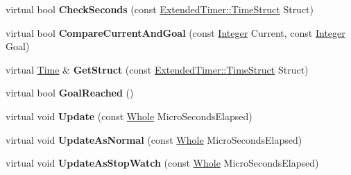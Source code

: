\begin{DoxyCompactItemize}
\item 
\hypertarget{classMezzanine_1_1ExtendedTimer_a14b36dde56ab4f89e9d98b8ba8302495}{
virtual bool {\bfseries CheckSeconds} (const \hyperlink{classMezzanine_1_1ExtendedTimer_a52119e2da54ea7ae5da0dc1f921a3b61}{ExtendedTimer::TimeStruct} Struct)}
\label{classMezzanine_1_1ExtendedTimer_a14b36dde56ab4f89e9d98b8ba8302495}

\item 
\hypertarget{classMezzanine_1_1ExtendedTimer_a0ec0f675c3bf946a2d732cd2916d8c4a}{
virtual bool {\bfseries CompareCurrentAndGoal} (const \hyperlink{namespaceMezzanine_ac3576e52af3c62d13dde94829e0c5465}{Integer} Current, const \hyperlink{namespaceMezzanine_ac3576e52af3c62d13dde94829e0c5465}{Integer} Goal)}
\label{classMezzanine_1_1ExtendedTimer_a0ec0f675c3bf946a2d732cd2916d8c4a}

\item 
\hypertarget{classMezzanine_1_1ExtendedTimer_ae9ff83ca2cb8082578c548edb6a6f3bf}{
virtual \hyperlink{structMezzanine_1_1Time}{Time} \& {\bfseries GetStruct} (const \hyperlink{classMezzanine_1_1ExtendedTimer_a52119e2da54ea7ae5da0dc1f921a3b61}{ExtendedTimer::TimeStruct} Struct)}
\label{classMezzanine_1_1ExtendedTimer_ae9ff83ca2cb8082578c548edb6a6f3bf}

\item 
\hypertarget{classMezzanine_1_1ExtendedTimer_a99040c65bdb611e5b58fe185f3715083}{
virtual bool {\bfseries GoalReached} ()}
\label{classMezzanine_1_1ExtendedTimer_a99040c65bdb611e5b58fe185f3715083}

\item 
\hypertarget{classMezzanine_1_1ExtendedTimer_a5d09b15c9c98e55023b58a71044a8831}{
virtual void {\bfseries Update} (const \hyperlink{namespaceMezzanine_adcbb6ce6d1eb4379d109e51171e2e493}{Whole} MicroSecondsElapsed)}
\label{classMezzanine_1_1ExtendedTimer_a5d09b15c9c98e55023b58a71044a8831}

\item 
\hypertarget{classMezzanine_1_1ExtendedTimer_aa8c5facae695e3c413d614fc7fe2b54e}{
virtual void {\bfseries UpdateAsNormal} (const \hyperlink{namespaceMezzanine_adcbb6ce6d1eb4379d109e51171e2e493}{Whole} MicroSecondsElapsed)}
\label{classMezzanine_1_1ExtendedTimer_aa8c5facae695e3c413d614fc7fe2b54e}

\item 
\hypertarget{classMezzanine_1_1ExtendedTimer_a4885f96441ab5f248a986545265e0afd}{
virtual void {\bfseries UpdateAsStopWatch} (const \hyperlink{namespaceMezzanine_adcbb6ce6d1eb4379d109e51171e2e493}{Whole} MicroSecondsElapsed)}
\label{classMezzanine_1_1ExtendedTimer_a4885f96441ab5f248a986545265e0afd}

\end{DoxyCompactItemize}
